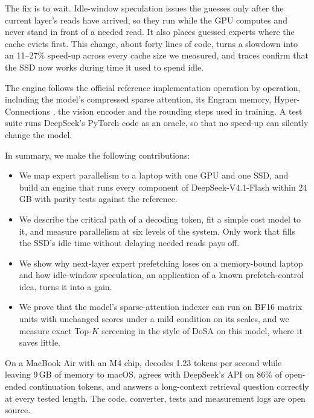 The fix is to wait. Idle-window speculation issues the guesses only after the current layer's reads have arrived, so they run while the GPU computes and never stand in front of a needed read. It also places guessed experts where the cache evicts first. This change, about forty lines of code, turns a slowdown into an 11--27\% speed-up across every cache size we measured, and traces confirm that the SSD now works during time it used to spend idle.

The engine follows the official reference implementation operation by operation, including the model's compressed sparse attention, its Engram memory, Hyper-Connections \citep{hyperconnections}, the vision encoder and the rounding steps used in training. A test suite runs DeepSeek's PyTorch code as an oracle, so that no speed-up can silently change the model.

In summary, we make the following contributions:
\begin{itemize}
  \item We map expert parallelism to a laptop with one GPU and one SSD, and build an engine that runs every component of DeepSeek-V4.1-Flash within 24\,GB with parity tests against the reference.
  \item We describe the critical path of a decoding token, fit a simple cost model to it, and measure parallelism at six levels of the system. Only work that fills the SSD's idle time without delaying needed reads pays off.
  \item We show why next-layer expert prefetching loses on a memory-bound laptop and how idle-window speculation, an application of a known prefetch-control idea, turns it into a gain.
  \item We prove that the model's sparse-attention indexer can run on BF16 matrix units with unchanged scores under a mild condition on its scales, and we measure exact Top-$K$ screening in the style of DoSA \citep{dosa} on this model, where it saves little.
\end{itemize}
On a MacBook Air with an M4 chip, \method{} decodes 1.23 tokens per second while leaving 9\,GB of memory to macOS, agrees with DeepSeek's API on 86\% of open-ended continuation tokens, and answers a long-context retrieval question correctly at every tested length. The code, converter, tests and measurement logs are open source.

